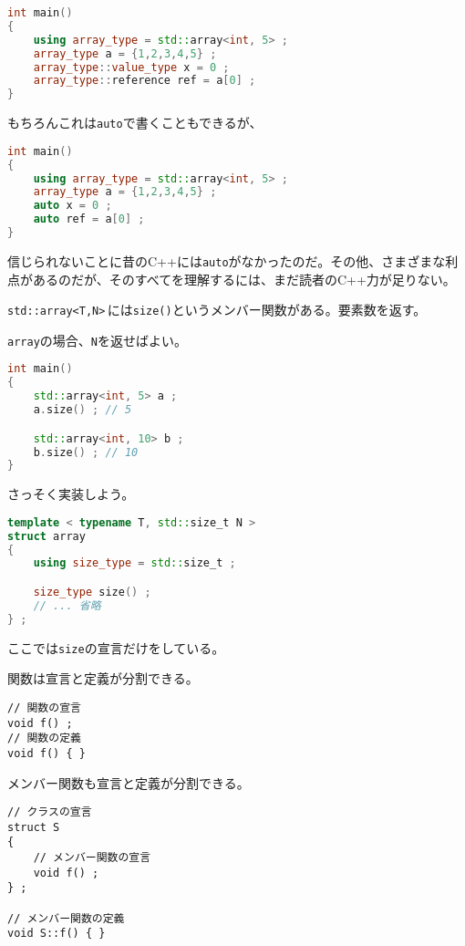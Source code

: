 \begin{lstlisting}[language={C++}]
int main()
{
    using array_type = std::array<int, 5> ;
    array_type a = {1,2,3,4,5} ;
    array_type::value_type x = 0 ;
    array_type::reference ref = a[0] ;
}
\end{lstlisting}

もちろんこれは\texttt{auto}で書くこともできるが、
\begin{lstlisting}[language={C++}]
int main()
{
    using array_type = std::array<int, 5> ;
    array_type a = {1,2,3,4,5} ;
    auto x = 0 ;
    auto ref = a[0] ;
}
\end{lstlisting}
信じられないことに昔のC++には\texttt{auto}がなかったのだ。その他、さまざまな利点があるのだが、そのすべてを理解するには、まだ読者のC++力が足りない。


\texttt{std::array<T,N>}\,には\texttt{size()}というメンバー関数がある。要素数を返す。

\texttt{array}の場合、\texttt{N}を返せばよい。

\begin{lstlisting}[language={C++}]
int main()
{
    std::array<int, 5> a ;
    a.size() ; // 5

    std::array<int, 10> b ;
    b.size() ; // 10
}
\end{lstlisting}

さっそく実装しよう。

\begin{lstlisting}[language={C++}]
template < typename T, std::size_t N >
struct array
{
    using size_type = std::size_t ;

    size_type size() ;
    // ... 省略
} ;
\end{lstlisting}

ここでは\texttt{size}の宣言だけをしている。

関数は宣言と定義が分割できる。

\ifTombow\pagebreak\fi
\begin{lstlisting}[style=grammar]
// 関数の宣言
void f() ;
// 関数の定義
void f() { }
\end{lstlisting}

メンバー関数も宣言と定義が分割できる。

\begin{lstlisting}[style=grammar]
// クラスの宣言
struct S
{
    // メンバー関数の宣言
    void f() ;
} ;

// メンバー関数の定義
void S::f() { }
\end{lstlisting}

